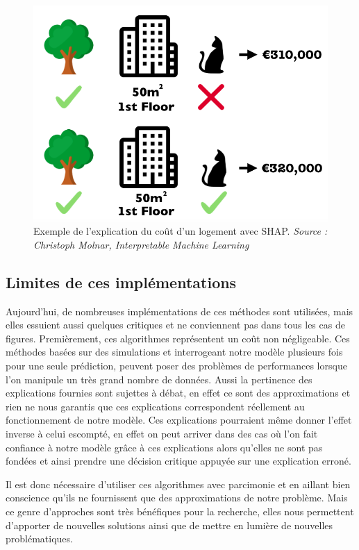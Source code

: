 \begin{figure}[h]
\centering
\includegraphics[scale=0.3]{src_img/shapleyExemple.png}
\caption{Exemple de l'explication du coût d'un logement avec SHAP. \textit{Source : Christoph Molnar, Interpretable Machine Learning}}
\label{shapleyExemple}
\end{figure}

\subsection{Limites de ces implémentations}
Aujourd'hui, de nombreuses implémentations de ces méthodes sont utilisées, mais elles essuient aussi quelques critiques et ne conviennent pas dans tous les cas de figures. Premièrement, ces algorithmes représentent un coût non négligeable. Ces méthodes basées sur des simulations et interrogeant notre modèle plusieurs fois pour une seule prédiction, peuvent poser des problèmes de performances lorsque l'on manipule un très grand nombre de données. Aussi la pertinence des explications fournies sont sujettes à débat, en effet ce sont des approximations et rien ne nous garantis que ces explications correspondent réellement au fonctionnement de notre modèle. Ces explications pourraient même donner l'effet inverse à celui escompté, en effet on peut arriver dans des cas où l'on fait confiance à notre modèle grâce à ces explications alors qu'elles ne sont pas fondées et ainsi prendre une décision critique appuyée sur une explication erroné.\par

Il est donc nécessaire d'utiliser ces algorithmes avec parcimonie et en aillant bien conscience qu'ils ne fournissent que des approximations de notre problème. Mais ce genre d'approches sont très bénéfiques pour la recherche, elles nous permettent d'apporter de nouvelles solutions ainsi que de mettre en lumière de nouvelles problématiques.
